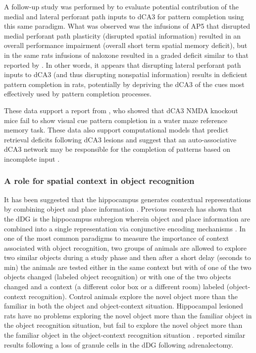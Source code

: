 \documentclass[doc, longtable]{apa6}
\begin{document}
A follow-up study was performed by \textcite{Kesner2010b} to evaluate potential contribution of the medial and lateral perforant path inputs to dCA3 for pattern completion using this same paradigm. What was observed was the infusions of AP5 that disrupted medial perforant path plasticity (disrupted spatial information) resulted in an overall performance impairment (overall short term spatial memory deficit), but in the same rats infusions of naloxone resulted in a graded deficit similar to that reported by \textcite{Gold2005a}. In other words, it appears that disrupting lateral perforant path inputs to dCA3 (and thus disrupting nonspatial information) results in deficient pattern completion in rats, potentially by depriving the dCA3 of the cues most effectively used by pattern completion processes. 

These data support a report from \textcite{Nakazawa2002a}, who showed that dCA3 NMDA knockout mice fail to show visual cue pattern completion in a water maze reference memory task. These data also support computational models that predict retrieval deficits following dCA3 lesions and suggest that an auto-associative dCA3 network may be responsible for the completion of patterns based on incomplete input \parencite{OReilly2001a, Rolls1998a, Shapiro1994a, hunsaker2013operation}.

\subsubsection{A role for spatial context in object recognition}
It has been suggested that the hippocampus generates contextual representations by combining object and place information \parencite{Rolls1996a, Rolls2006b, Hunsaker2007c}. Previous research has shown that the dDG is the hippocampus subregion wherein object and place information are combined into a single representation via conjunctive encoding mechanisms \parencite{Hunsaker2007c, Kesner2012b}. In one of the most common paradigms to measure the importance of context associated with object recognition, two groups of animals are allowed to explore two similar objects during a study phase and then after a short delay (seconds to min) the animals are tested either in the same context but with of one of the two objects changed (labeled object recognition) or with one of the two objects changed and a context (a different color box or a different room) labeled (object-context recognition). Control animals explore the novel object more than the familiar in both the object and object-context situation. Hippocampal lesioned rats have no problems exploring the novel object more than the familiar object in the object recognition situation, but fail to explore the novel object more than the familiar object in the object-context recognition situation \parencite{Dellu1997b, Mumby2001a, OBrien2006b, Piterkin2008b}. \textcite{Spanswick2010a} reported similar results following a loss of granule cells in the dDG following adrenalectomy. 
\end{document}
